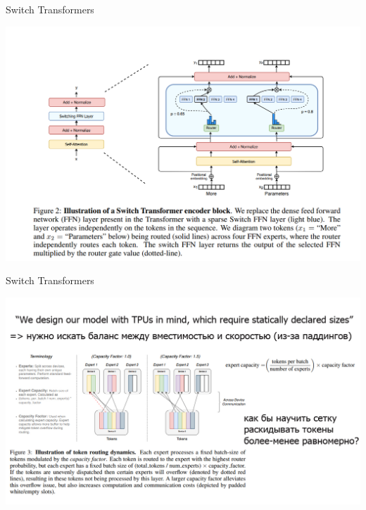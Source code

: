 \documentclass[aspectratio=169,xcolor=dvipsnames]{beamer}
\begin{document}
\begin{frame}{Switch Transformers}
\begin{center}
\includegraphics[scale=0.35]{switch3.png}    
\end{center} 
\end{frame}

\begin{frame}{Switch Transformers}
\begin{center}
\includegraphics[scale=0.4]{st1.jpg}    
\end{center} 
\end{frame}
\end{document}
